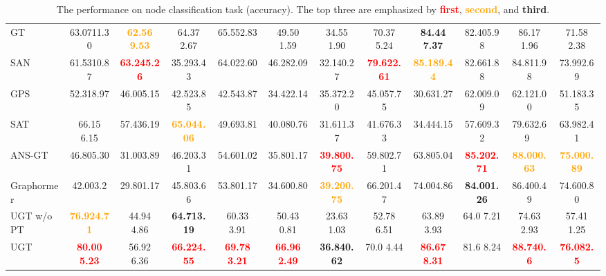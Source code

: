 \documentclass[oneside]{article}
\begin{document}
\begin{table*}[t]
\begin{adjustbox}{width=1\textwidth}
\begin{tabular}{l ccc cccccccc}
    GT & 63.0711.30 &\textcolor{orange}{\textbf{ 62.56 9.53}} & 64.37  2.67  & 65.552.83 & 49.50 1.59 & 34.55 1.90 & 70.37 5.24 &  \textbf{84.44 7.37} & 82.405.98 & 86.17 1.96 & 71.58 2.38 \\
    
     SAN & 61.5310.87 &\textcolor{red}{\textbf{ 63.245.26}} & 35.293.43 & 
    64.022.60&
    46.282.09 &
    32.140.27& 
    \textcolor{red}{\textbf{79.622.61}}& 
    \textcolor{orange}{\textbf{85.189.44}}& 
    82.661.88& 
    84.811.98& 
    73.992.69 \\
    
     GPS & 52.318.97 & 46.005.15 & 42.523.85  & 42.543.87 & 34.422.14 &35.372.20 &45.057.75 &30.631.27 &62.009.09 & 62.121.00 & 51.183.35 \\
    
   SAT &66.15 6.15 & 57.436.19 & \textcolor{orange}{\textbf{65.044.06}}& 49.693.81 &40.080.76& 31.611.37 & 41.676.33 & 34.444.15& 57.609.32& 79.632.69\ & 63.982.41 \\
    
    ANS-GT& 46.805.30 & 31.003.89& 46.203.31  & 54.601.02 &35.801.17 & \textcolor{red}{\textbf{39.800.75}} &59.802.71&63.805.04&\textcolor{red}{\textbf{85.202.71}}&\textcolor{orange}{\textbf{88.000.63}}&\textcolor{orange}{\textbf{75.000.89}} \\
    
    Graphormer &42.003.2 &29.801.17&45.803.66&53.801.17  &34.600.80& \textcolor{orange}{\textbf{39.200.75}}  & 66.201.47& 74.004.86 &
    \textbf{84.001.26} & 86.400.49& 74.600.80\\\hline
    
    UGT w/o PT &\textcolor{orange}{\textbf{76.92{4.71}}} 
    & 44.94 4.86 
    & {\textbf{ 64.713.19}}  
    & 60.33 3.91 
    & 50.43  0.81 
    & 23.63  1.03
    &  52.78 6.51 
    &   63.89  3.93 
    & 64.0 7.21
    & 74.63 2.93  
    &57.41 1.25  \\


     UGT  
     & \textcolor{red}{\textbf{80.00 5.23}}
     & 56.92 6.36
     &\textcolor{red}{\textbf{ 66.224.55}} 
     & \textcolor{red}{\textbf{ 69.78 3.21}} 
     &\textcolor{red}{\textbf{  66.96 2.49}} 
     & \textbf{36.840.62} 
     & 70.0 4.44
     &  \textcolor{red}{\textbf{86.67 8.31}} 
     & 81.6  8.24
     & \textcolor{red}{\textbf{ 88.740.6 }} 
     & \textcolor{red}{\textbf{ 76.082.5}} \\


    \hline
\end{tabular}
\end{adjustbox}
\caption{The performance on node classification task (accuracy). 
The top three are emphasized by \textcolor{red}{\textbf{first}}, \textcolor{orange}{\textbf{second}}, and \textbf{third}. }
\label{tab:node_classification}
\end{table*}
\end{document}
